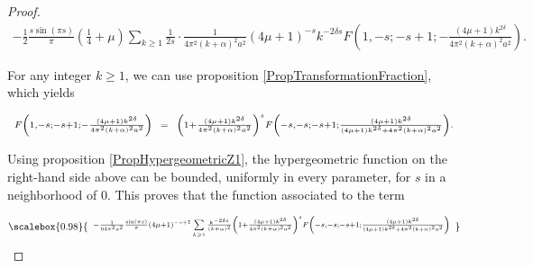 \documentclass{jams-l}
\theoremstyle{definition}
\theoremstyle{remark}
\numberwithin{equation}{section}
\newcommand\scalemath[2]{\scalebox{#1}{\mbox{\ensuremath{\displaystyle #2}}}}
\begin{document}
\begin{proof}
                        \[ \begin{array}{c}
                                \scriptstyle - \frac{1}{2} \frac{s \sin \left( \pi s \right)}{\pi} \left( \frac{1}{4} + \mu \right) \sum\limits_{k \geqslant 1} \frac{1}{2s} \cdot \frac{1}{4 \pi^2 \left( k + \alpha \right)^2 a^2} \left( 4 \mu + 1 \right)^{-s} k^{-2 \delta s} F \left( 1, -s; -s+1; - \frac{\left( 4 \mu + 1 \right) k^{2 \delta}}{4 \pi^2 \left( k + \alpha \right)^2 a^2} \right).
                            \end{array} \]
                        
                        \noindent For any integer $k \geqslant 1$, we can use proposition \ref{PropTransformationFraction}, which yields
                        
                        \[ \begin{array}{lll}
                                \scriptstyle F \left( 1, -s; -s+1; - \frac{\left( 4 \mu + 1 \right) k^{2 \delta}}{4 \pi^2 \left( k + \alpha \right)^2 a^2} \right) & \hspace{-3.5pt} \scriptstyle = \hspace{-3.5pt} & \scriptstyle \left( 1 + \frac{\left( 4 \mu + 1 \right) k^{2 \delta}}{4 \pi^2 \left( k + \alpha \right)^2 a^2} \right)^s F \left( -s, -s; -s+1; \frac{\left( 4 \mu + 1 \right) k^{2 \delta}}{\left( 4 \mu + 1 \right) k^{2 \delta} + 4 \pi^2 \left( k + \alpha \right)^2 a^2} \right).
                            \end{array} \]
                        
                        \noindent Using proposition \ref{PropHypergeometricZ1}, the hypergeometric function on the right-hand side above can be bounded, uniformly in every parameter, for $s$ in a neighborhood of $0$. This proves that the function associated to the term
                        
                        \[ \scalemath{0.98}{\begin{array}{c}
                                \scriptstyle - \frac{1}{64 \pi^2 a^2} \frac{\sin \left( \pi s \right)}{\pi} \left( 4 \mu + 1 \right)^{-s+1} \sum\limits_{k \geqslant 1} \frac{k^{-2 \delta s}}{\left( k + \alpha \right)^2} \left( 1 + \frac{\left( 4 \mu + 1 \right) k^{2 \delta}}{4 \pi^2 \left( k + \alpha \right)^2 a^2} \right)^s F \left( -s, -s; -s+1; \frac{\left( 4 \mu + 1 \right) k^{2 \delta}}{\left( 4 \mu + 1 \right) k^{2 \delta} + 4 \pi^2 \left( k + \alpha \right)^2 a^2} \right)
                            \end{array}} \]
                        

\end{proof}
\end{document}
